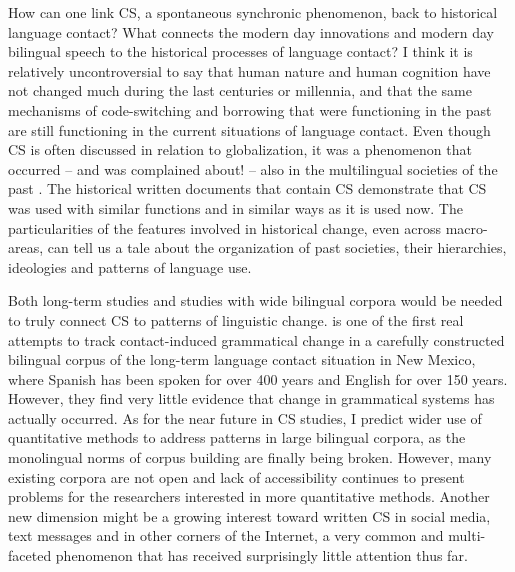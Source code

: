 \documentclass[output=paper]{langscibook}
\begin{document}
How can one link CS, a spontaneous synchronic phenomenon, back to historical language contact? What connects the modern day innovations and modern day bilingual speech to the historical processes of language contact? I think it is relatively uncontroversial to say that human nature and human cognition have not changed much during the last centuries or millennia, and that the same mechanisms of code-switching and borrowing that were functioning in the past are still functioning in the current situations of language contact. Even though CS is often discussed in relation to globalization, it was a phenomenon that occurred – and was complained about! – also in the multilingual societies of the past \parencite{lantto20165}. The historical written documents that contain CS demonstrate that CS was used with similar functions and in similar ways as it is used now. The particularities of the features involved in historical change, even across macro-areas, can tell us a tale about the organization of past societies, their hierarchies, ideologies and patterns of language use. 


Both long-term studies and studies with wide bilingual corpora would be nee\-ded to truly connect CS to patterns of linguistic change. \textcite{cacoullos2018bilingualism} is one of the first real attempts to track contact-induced grammatical change in a carefully constructed bilingual corpus of the long-term language contact situation in New Mexico, where Spanish has been spoken for over 400 years and English for over 150 years. However, they find very little evidence that change in grammatical systems has actually occurred. As for the near future in CS studies, I predict wider use of quantitative methods to address patterns in large bilingual corpora, as the monolingual norms of corpus building are finally being broken. However, many existing corpora are not open and lack of accessibility continues to present problems for the researchers interested in more quantitative methods. Another new dimension might be a growing interest toward written CS in social media, text messages and in other corners of the Internet, a very common and multi-faceted phenomenon that has received surprisingly little attention thus far.


\printbibliography[heading=subbibliography,notkeyword=this]
\end{document}
